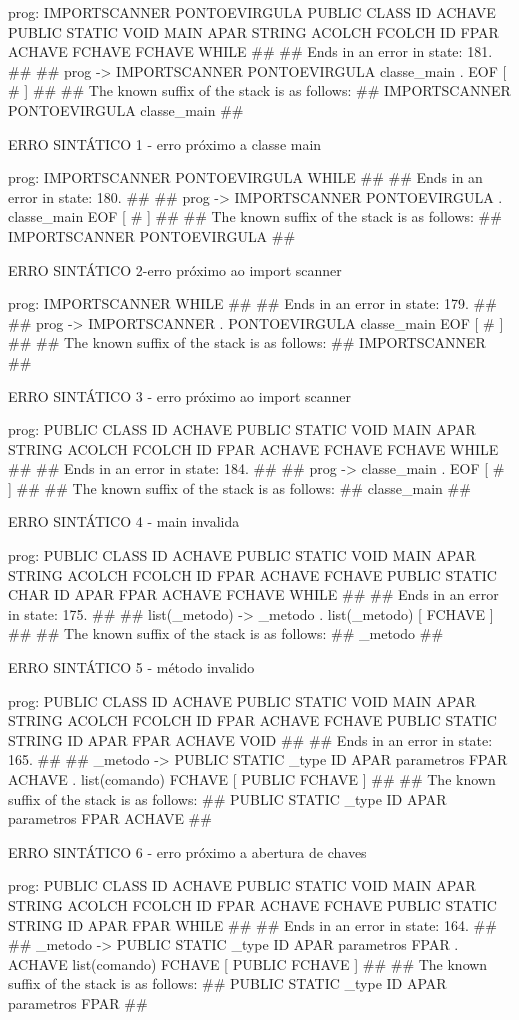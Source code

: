 \documentclass[12pt,a4paper,twoside]{report}
\begin{document}
\begin{terminal}
prog: IMPORTSCANNER PONTOEVIRGULA PUBLIC CLASS ID ACHAVE PUBLIC STATIC VOID MAIN APAR STRING ACOLCH FCOLCH ID FPAR ACHAVE FCHAVE FCHAVE WHILE 
##
## Ends in an error in state: 181.
##
## prog -> IMPORTSCANNER PONTOEVIRGULA classe_main . EOF [ # ]
##
## The known suffix of the stack is as follows:
## IMPORTSCANNER PONTOEVIRGULA classe_main 
##

ERRO SINTÁTICO 1 - erro próximo a classe main

prog: IMPORTSCANNER PONTOEVIRGULA WHILE
##
## Ends in an error in state: 180.
##
## prog -> IMPORTSCANNER PONTOEVIRGULA . classe_main EOF [ # ]
##
## The known suffix of the stack is as follows:
## IMPORTSCANNER PONTOEVIRGULA 
##

ERRO SINTÁTICO 2-erro próximo ao import scanner

prog: IMPORTSCANNER WHILE 
##
## Ends in an error in state: 179.
##
## prog -> IMPORTSCANNER . PONTOEVIRGULA classe_main EOF [ # ]
##
## The known suffix of the stack is as follows:
## IMPORTSCANNER 
##

ERRO SINTÁTICO 3 -  erro próximo ao import scanner

prog: PUBLIC CLASS ID ACHAVE PUBLIC STATIC VOID MAIN APAR STRING ACOLCH FCOLCH ID FPAR ACHAVE FCHAVE FCHAVE WHILE 
##
## Ends in an error in state: 184.
##
## prog -> classe_main . EOF [ # ]
##
## The known suffix of the stack is as follows:
## classe_main 
##

ERRO SINTÁTICO 4 -   main invalida

prog: PUBLIC CLASS ID ACHAVE PUBLIC STATIC VOID MAIN APAR STRING ACOLCH FCOLCH ID FPAR ACHAVE FCHAVE PUBLIC STATIC CHAR ID APAR FPAR ACHAVE FCHAVE WHILE 
##
## Ends in an error in state: 175.
##
## list(_metodo) -> _metodo . list(_metodo) [ FCHAVE ]
##
## The known suffix of the stack is as follows:
## _metodo 
##

ERRO SINTÁTICO 5 -  método invalido

prog: PUBLIC CLASS ID ACHAVE PUBLIC STATIC VOID MAIN APAR STRING ACOLCH FCOLCH ID FPAR ACHAVE FCHAVE PUBLIC STATIC STRING ID APAR FPAR ACHAVE VOID 
##
## Ends in an error in state: 165.
##
## _metodo -> PUBLIC STATIC _type ID APAR parametros FPAR ACHAVE . list(comando) FCHAVE [ PUBLIC FCHAVE ]
##
## The known suffix of the stack is as follows:
## PUBLIC STATIC _type ID APAR parametros FPAR ACHAVE 
##

ERRO SINTÁTICO 6 -  erro próximo a abertura de chaves

prog: PUBLIC CLASS ID ACHAVE PUBLIC STATIC VOID MAIN APAR STRING ACOLCH FCOLCH ID FPAR ACHAVE FCHAVE PUBLIC STATIC STRING ID APAR FPAR WHILE 
##
## Ends in an error in state: 164.
##
## _metodo -> PUBLIC STATIC _type ID APAR parametros FPAR . ACHAVE list(comando) FCHAVE [ PUBLIC FCHAVE ]
##
## The known suffix of the stack is as follows:
## PUBLIC STATIC _type ID APAR parametros FPAR 
##


\end{terminal}
\end{document}
